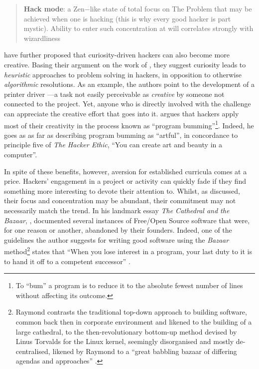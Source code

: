 \begin{quote}
\textbf{Hack mode}: a Zen−like state of total focus on The Problem that may be achieved when one is hacking (this is why every good hacker is part mystic). Ability to enter such concentration at will correlates strongly with wizardliness \citep[p.331]{raymond93}
\end{quote}


\citet{lakhani03} have further proposed that curiosity-driven hackers can also become more creative. Basing their argument on the work of \citet{amabile96}, they suggest curiosity leads to \textit{heuristic} approaches to problem solving in hackers, in opposition to otherwise \textit{algorithmic} resolutions. As an example, the authors point to the development of a printer driver ---a task not easily perceivable as \emph{creative} by someone not connected to the project. Yet, anyone who is directly involved with the challenge can appreciate the creative effort that goes into it. \citet[pp.13--33]{levy84} argues that hackers apply most of their creativity in the process known as ``program bumming''\footnote{To ``bum'' a program is to reduce it to the absolute fewest number of lines without affecting its outcome.}. Indeed, he goes as as far as describing program bumming as ``artful'', in concordance to principle five of \textit{The Hacker Ethic}, ``You can create art and beauty in a computer''.

In spite of these benefits, however, aversion for established curricula comes at a price. Hackers' engagement in a project or activity can quickly fade if they find something more interesting to devote their attention to. Whilst, as discussed, their focus and concentration may be abundant, their commitment may not necessarily match the trend. In his landmark essay \textit{The Cathedral and the Bazaar}, \citet{raymond99a}, documented several instances of Free/Open Source software that were, for one reason or another, abandoned by their founders. Indeed, one of the guidelines the author suggests for writing good software using the \emph{Bazaar} method\footnote{Raymond contrasts the traditional top-down approach to building software, common back then in corporate environment and likened to the building of a large cathedral, to the then-revolutionary bottom-up method devised by Linus Torvalds for the Linux kernel, seemingly disorganised and mostly de-centralised, likened by Raymond to a ``great babbling bazaar of differing agendas and approaches'' \citep[p.3]{raymond99a}.} states that ``When you lose interest in a program, your last duty to it is to hand it off to a competent successor'' \citep[p.6]{raymond99a}.

